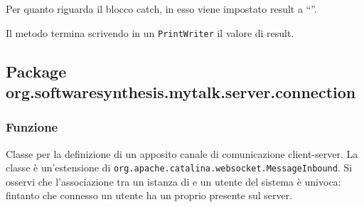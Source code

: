 \begin{description}
	Per quanto riguarda il blocco catch, in esso viene impostato result a ``''.
	
	Il metodo termina scrivendo in un \texttt{PrintWriter} il valore di result.
\end{description}


\subsection{Package org.softwaresynthesis.mytalk.server.connection}\label{sec:connection}


\subsubsection*{Funzione}
Classe per la definizione di un apposito canale di comunicazione client-server. La classe è un'estensione di \texttt{org.apache.catalina.websocket.MessageInbound}. Si osservi che l'associazione tra un istanza di  e un utente del sistema è univoca: fintanto che connesso un utente ha un proprio  presente sul server.

